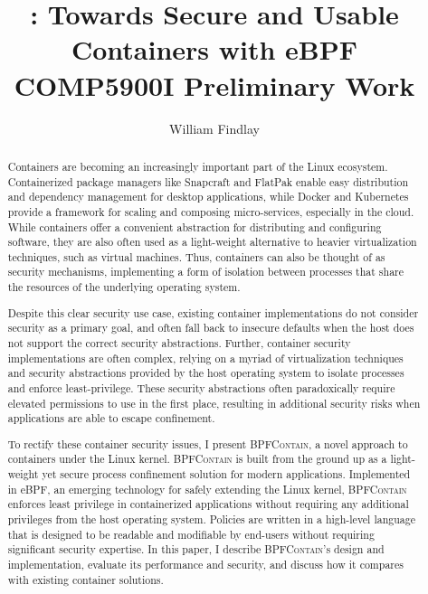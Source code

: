 \documentclass[dvipsnames, 12pt]{article}
\title{\Large \bpfcontain: Towards Secure and Usable Containers with eBPF\\{\large COMP5900I Preliminary Work}}
\author{William Findlay}
\def\bpfcontain{\textsc{BPFContain}}
\begin{document}

\maketitle
\thispagestyle{empty}

\vfill
\begin{abstract}
\noindent
{}
Containers are becoming an increasingly important part of the Linux ecosystem.  Containerized package managers like Snapcraft \cite{snap} and FlatPak \cite{flatpak} enable easy distribution and dependency management for desktop applications, while Docker \cite{docker} and Kubernetes \cite{kubernetes} provide a framework for scaling and composing micro-services, especially in the cloud.  While containers offer a convenient abstraction for distributing and configuring software, they are also often used as a light-weight alternative to heavier virtualization techniques, such as virtual machines. Thus, containers can also be thought of as security mechanisms, implementing a form of isolation between processes that share the resources of the underlying operating system.

Despite this clear security use case, existing container implementations do not consider security as a primary goal, and often fall back to insecure defaults when the host does not support the correct security abstractions. Further, container security implementations are often complex, relying on a myriad of virtualization techniques and security abstractions provided by the host operating system to isolate processes and enforce least-privilege. These security abstractions often paradoxically require elevated permissions to use in the first place, resulting in additional security risks when applications are able to escape confinement.

To rectify these container security issues, I present \bpfcontain{}, a novel approach to containers under the Linux kernel. \bpfcontain{} is built from the ground up as a light-weight yet secure process confinement solution for modern applications. Implemented in eBPF, an emerging technology for safely extending the Linux kernel, \bpfcontain{} enforces least privilege in containerized applications without requiring any additional privileges from the host operating system. Policies are written in a high-level language that is designed to be readable and modifiable by end-users without requiring significant security expertise. In this paper, I describe \bpfcontain{}'s design and implementation, evaluate its performance and security, and discuss how it compares with existing container solutions.

\end{abstract}
\vfill
\vfill
\end{document}
